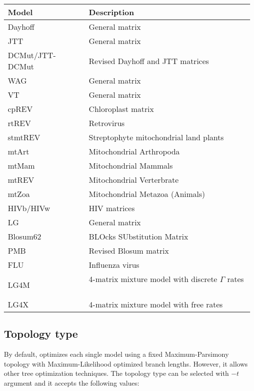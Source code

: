 \vspace{1em}
\begin{tabular}{ll}
  \hline
  {\bf Model} & {\bf Description} \\
  \hline
  Dayhoff &	General matrix~\citep{dayhoff1978} \\
  \hline
  JTT &	General matrix~\citep{jones1992} \\
  \hline
  DCMut/JTT-DCMut & Revised Dayhoff and JTT matrices~\citep{kosiol2005} \\
  \hline
  WAG & General matrix~\citep{whelan2001} \\
  \hline
  VT & General matrix~\citep{muller2000}  \\
  \hline
  cpREV & Chloroplast matrix~\citep{adachi2000} \\
  \hline
  rtREV & Retrovirus~\citep{dimmic2002} \\
  \hline
  stmtREV & Streptophyte mitochondrial land plants~\citep{liu2014} \\
  \hline
  mtArt & Mitochondrial Arthropoda~\citep{abascal2007} \\
  \hline
  mtMam & Mitochondrial Mammals~\citep{yang1998} \\
  \hline
  mtREV & Mitochondrial Verterbrate~\citep{adachi1996} \\
  \hline
  mtZoa & Mitochondrial Metazoa (Animals)~\citep{rota2009} \\
  \hline
  HIVb/HIVw & HIV matrices ~\citep{nickle2007} \\
  \hline
  LG & General matrix~\citep{le2008} \\
  \hline
  Blosum62 & BLOcks SUbstitution Matrix~\citep{henikoff1992} \\
  \hline
  PMB & Revised Blosum matrix~\citep{veerassamy2003} \\
  \hline
  FLU & Influenza virus~\citep{dang2010} \\
  \hline
  LG4M & 4-matrix mixture model with discrete $\Gamma$ rates ~\citep{le2012} \\
  \hline
  LG4X & 4-matrix mixture model with free rates~\citep{le2012} \\
  \hline
\end{tabular}

\subsection{Topology type}
\label{sec:arg:topo}

By default, \modeltest optimizes each single model using a fixed Maximum-Parsimony topology
with Maximum-Likelihood optimized branch lengths.
However, it allows other tree optimization techniques.
The topology type can be selected with $-t$ argument and it accepts the following values:

